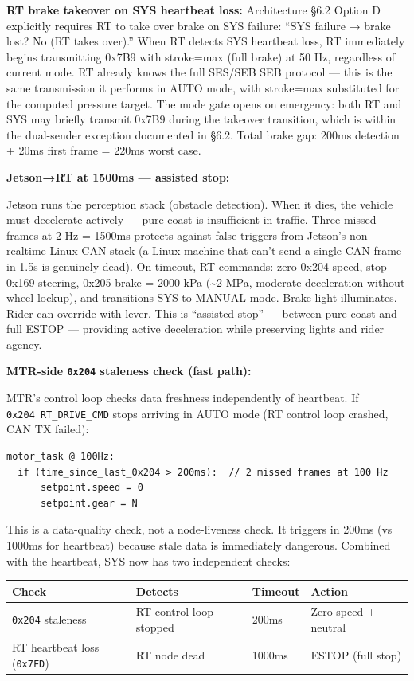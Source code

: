 \textbf{RT brake takeover on SYS heartbeat loss:} Architecture §6.2 Option D
explicitly requires RT to take over brake on SYS failure: ``SYS failure → brake
lost? No (RT takes over).'' When RT detects SYS heartbeat loss, RT immediately
begins transmitting 0x7B9 with stroke=max (full brake) at 50 Hz, regardless of
current mode. RT already knows the full SES/SEB SEB protocol --- this is the
same transmission it performs in AUTO mode, with stroke=max substituted for the
computed pressure target. The mode gate opens on emergency: both RT and SYS may
briefly transmit 0x7B9 during the takeover transition, which is within the
dual-sender exception documented in §6.2. Total brake gap: 200ms detection +
20ms first frame = 220ms worst case.

\textbf{Jetson→RT at 1500ms --- assisted stop:}

Jetson runs the perception stack (obstacle detection). When it dies, the vehicle
must decelerate actively --- pure coast is insufficient in traffic. Three missed
frames at 2 Hz = 1500ms protects against false triggers from Jetson's
non-realtime Linux CAN stack (a Linux machine that can't send a single CAN frame
in 1.5s is genuinely dead). On timeout, RT commands: zero 0x204 speed, stop
0x169 steering, 0x205 brake = 2000 kPa (\textasciitilde2 MPa, moderate
deceleration without wheel lockup), and transitions SYS to MANUAL mode. Brake
light illuminates. Rider can override with lever. This is ``assisted stop'' ---
between pure coast and full ESTOP --- providing active deceleration while
preserving lights and rider agency.

\textbf{MTR-side \texttt{0x204} staleness check (fast path):}

MTR's control loop checks data freshness independently of heartbeat. If
\texttt{0x204\ RT\_DRIVE\_CMD} stops arriving in AUTO mode (RT control loop
crashed, CAN TX failed):

\begin{verbatim}
motor_task @ 100Hz:
  if (time_since_last_0x204 > 200ms):  // 2 missed frames at 100 Hz
      setpoint.speed = 0
      setpoint.gear = N
\end{verbatim}

This is a data-quality check, not a node-liveness check. It triggers in 200ms
(vs 1000ms for heartbeat) because stale data is immediately dangerous. Combined
with the heartbeat, SYS now has two independent checks:

\begin{longtable}[]{@{}llll@{}}
\toprule\noalign{}
Check & Detects & Timeout & Action \\
\midrule\noalign{}
\endhead
\bottomrule\noalign{}
\endlastfoot
\texttt{0x204} staleness & RT control loop stopped & 200ms & Zero speed +
neutral \\
RT heartbeat loss (\texttt{0x7FD}) & RT node dead & 1000ms & ESTOP (full
stop) \\
\end{longtable}

